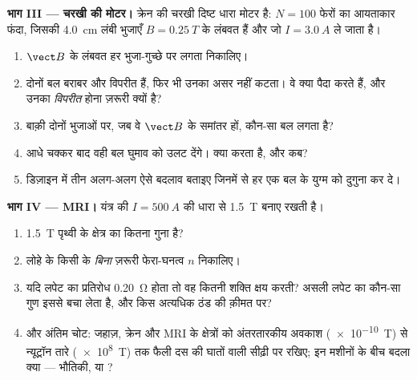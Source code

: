 \begin{problem}
\medskip
\noindent\textbf{भाग III --- चरखी की मोटर।}
क्रेन की चरखी दिष्ट धारा मोटर है: $N = 100$ फेरों का आयताकार फंदा, जिसकी
\qty{4.0}{cm} लंबी भुजाएँ $B = \qty{0.25}{T}$ के लंबवत हैं और जो $I = \qty{3.0}{A}$ ले जाता है।
\begin{enumerate}[resume]
  \item $\vect B$ के लंबवत हर भुजा-गुच्छे पर लगता 
        निकालिए।
  \item दोनों बल बराबर और विपरीत हैं, फिर भी उनका असर नहीं कटता। वे
        क्या पैदा करते हैं, और उनका \emph{विपरीत} होना ज़रूरी क्यों है?
  \item बाक़ी दोनों भुजाओं पर, जब वे $\vect B$ के समांतर हों, कौन-सा
        बल लगता है?
  \item आधे चक्कर बाद वही बल घुमाव को उलट देंगे। 
        क्या करता है, और कब?
  \item डिज़ाइन में तीन अलग-अलग ऐसे बदलाव बताइए जिनमें से हर एक बल
        के युग्म को दुगुना कर दे।
\end{enumerate}

\medskip
\noindent\textbf{भाग IV --- MRI।}
यंत्र की  $I = \qty{500}{A}$ की धारा से  \qty{1.5}{T} बनाए रखती है।
\begin{enumerate}[resume]
  \item \qty{1.5}{T} पृथ्वी के क्षेत्र का कितना गुना है?
  \item लोहे के किसी  के \emph{बिना} ज़रूरी फेरा-घनत्व $n$ निकालिए।
  \item यदि लपेट का प्रतिरोध \qty{0.20}{\ohm} होता तो वह कितनी
        शक्ति क्षय करती? असली लपेट का कौन-सा गुण इससे बचा लेता है,
        और किस अत्यधिक ठंड की क़ीमत पर?
  \item और अंतिम चोट: जहाज़, क्रेन और MRI के क्षेत्रों को
        अंतरतारकीय अवकाश (\qty{e-10}{T}) से न्यूट्रॉन तारे (\qty{e8}{T}) तक फैली दस की
        घातों वाली सीढ़ी पर रखिए; इन मशीनों के बीच बदला क्या --- भौतिकी, या
        ?
\end{enumerate}
\end{problem}
